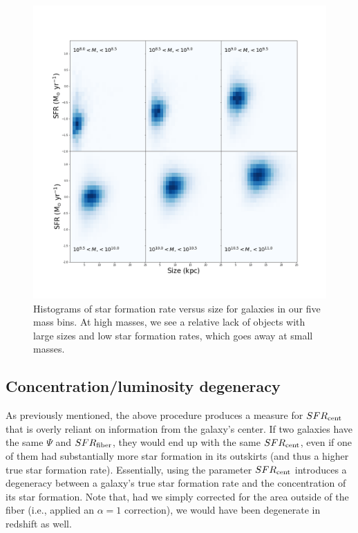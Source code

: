 \documentclass[iop]{emulateapj}
\begin{document}
\begin{figure}
	\centering
	\includegraphics[width=2 \columnwidth]{size_sfr_linear.png}
	\caption{Histograms of star formation rate versus size for galaxies in our five mass bins. At high masses, we see a relative lack of objects with large sizes and low star formation rates, which goes away at small masses.}
	\label{fig:size_sfr}
	
\end{figure}


\subsection{Concentration/luminosity degeneracy}
\label{sec:concdep}
As previously mentioned, the above procedure produces a measure for $SFR_{\rm cent}$ that is overly reliant on information from the galaxy's center. If two galaxies have the same $\Psi$ and $SFR_{\rm fiber}$, they would end up with the same $SFR_{\rm cent}$, even if one of them had substantially more star formation in its outskirts (and thus a higher true star formation rate). Essentially, using the parameter $SFR_{\rm cent}$ introduces a degeneracy between a galaxy's true star formation rate and the concentration of its star formation. Note that, had we simply corrected for the area outside of the fiber (i.e., applied an $\alpha= 1$ correction), we would have been degenerate in redshift as well.
\end{document}
